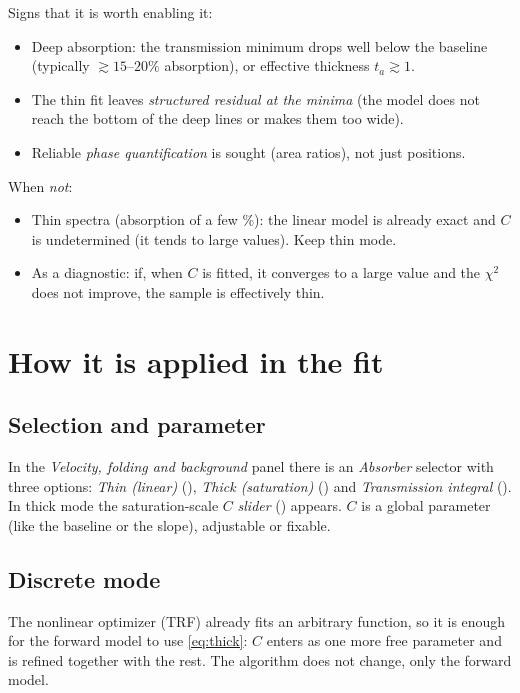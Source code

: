 Signs that it is worth enabling it:
\begin{itemize}[leftmargin=*]
  \item Deep absorption: the transmission minimum drops well below the
        baseline (typically $\gtrsim 15$–$20\%$ absorption), or effective thickness
        $t_a\gtrsim 1$.
  \item The thin fit leaves \emph{structured residual at the minima} (the
        model does not reach the bottom of the deep lines or makes them too
        wide).
  \item Reliable \emph{phase quantification} is sought (area ratios), not
        just positions.
\end{itemize}
When \emph{not}:
\begin{itemize}[leftmargin=*]
  \item Thin spectra (absorption of a few \%): the linear model is already exact and
        $C$ is undetermined (it tends to large values). Keep thin mode.
  \item As a diagnostic: if, when $C$ is fitted, it converges to a large value and
        the $\chi^2$ does not improve, the sample is effectively thin.
\end{itemize}

\section{How it is applied in the fit}

\subsection{Selection and parameter}
In the \emph{Velocity, folding and background} panel there is an \emph{Absorber}
selector with three options: \emph{Thin (linear)} (), \emph{Thick
(saturation)} () and \emph{Transmission integral}
(). In thick mode the saturation-scale $C$ \emph{slider}
() appears. $C$ is a global parameter
(like the baseline or the slope), adjustable or fixable.

\subsection{Discrete mode}
The nonlinear optimizer (TRF) already fits an arbitrary function, so it is enough
for the forward model to use \eqref{eq:thick}: $C$ enters as one more free
parameter and is refined together with the rest. The algorithm does not change,
only the forward model.

